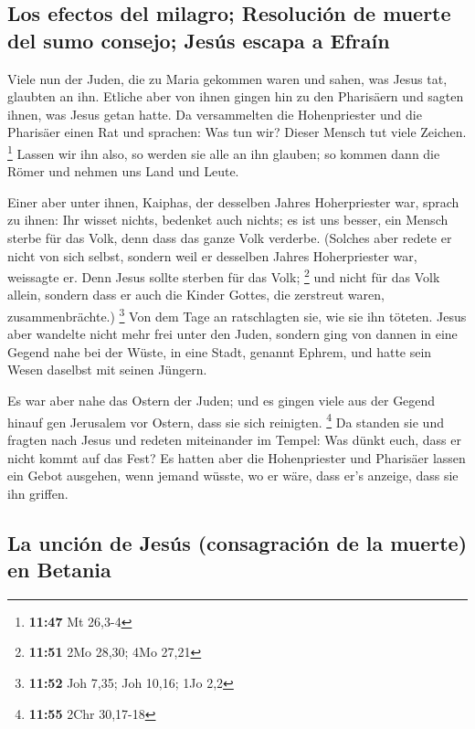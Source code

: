 \hypertarget{los-efectos-del-milagro-resoluciuxf3n-de-muerte-del-sumo-consejo-jesuxfas-escapa-a-efrauxedn}{%
\subsection{Los efectos del milagro; Resolución de muerte del sumo
consejo; Jesús escapa a
Efraín}\label{los-efectos-del-milagro-resoluciuxf3n-de-muerte-del-sumo-consejo-jesuxfas-escapa-a-efrauxedn}}

 Viele nun der Juden, die zu Maria gekommen waren und
sahen, was Jesus tat, glaubten an ihn.  Etliche aber von
ihnen gingen hin zu den Pharisäern und sagten ihnen, was Jesus getan
hatte.  Da versammelten die Hohenpriester und die
Pharisäer einen Rat und sprachen: Was tun wir? Dieser Mensch tut viele
Zeichen. \footnote{\textbf{11:47} Mt 26,3-4}  Lassen wir
ihn also, so werden sie alle an ihn glauben; so kommen dann die Römer
und nehmen uns Land und Leute.

 Einer aber unter ihnen, Kaiphas, der desselben Jahres
Hoherpriester war, sprach zu ihnen: Ihr wisset nichts, 
bedenket auch nichts; es ist uns besser, ein Mensch sterbe für das Volk,
denn dass das ganze Volk verderbe.  (Solches aber redete
er nicht von sich selbst, sondern weil er desselben Jahres Hoherpriester
war, weissagte er. Denn Jesus sollte sterben für das Volk; \footnote{\textbf{11:51}
  2Mo 28,30; 4Mo 27,21}  und nicht für das Volk allein,
sondern dass er auch die Kinder Gottes, die zerstreut waren,
zusammenbrächte.) \footnote{\textbf{11:52} Joh 7,35; Joh 10,16; 1Jo 2,2}
 Von dem Tage an ratschlagten sie, wie sie ihn töteten.
 Jesus aber wandelte nicht mehr frei unter den Juden,
sondern ging von dannen in eine Gegend nahe bei der Wüste, in eine
Stadt, genannt Ephrem, und hatte sein Wesen daselbst mit seinen Jüngern.

 Es war aber nahe das Ostern der Juden; und es gingen
viele aus der Gegend hinauf gen Jerusalem vor Ostern, dass sie sich
reinigten. \footnote{\textbf{11:55} 2Chr 30,17-18}  Da
standen sie und fragten nach Jesus und redeten miteinander im Tempel:
Was dünkt euch, dass er nicht kommt auf das Fest?  Es
hatten aber die Hohenpriester und Pharisäer lassen ein Gebot ausgehen,
wenn jemand wüsste, wo er wäre, dass er's anzeige, dass sie ihn griffen.

\hypertarget{la-unciuxf3n-de-jesuxfas-consagraciuxf3n-de-la-muerte-en-betania}{%
\subsection{La unción de Jesús (consagración de la muerte) en
Betania}\label{la-unciuxf3n-de-jesuxfas-consagraciuxf3n-de-la-muerte-en-betania}}


